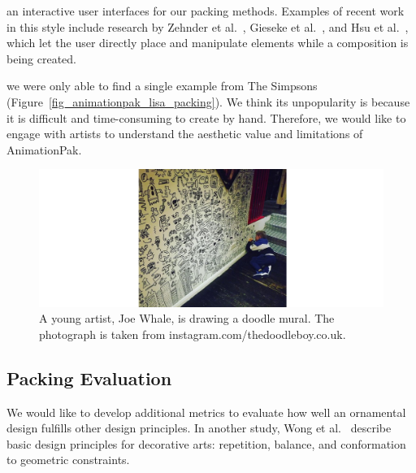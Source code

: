  an interactive user interfaces for our packing methods.
Examples of recent work in this style include research
by Zehnder et al.~\cite{Zehnder2016}, Gieseke et al.~\cite{Gieseke2017}, 
and Hsu et al.~\cite{Hsu2020}, which let the user directly place and manipulate
elements while a composition is being created.

we were only able to find a single example from The Simpsons (Figure~\ref{fig_animationpak_lisa_packing}). 
We think its unpopularity is because it is difficult and time-consuming to create by hand.
Therefore, we would like to engage with artists to understand the aesthetic value and limitations
of AnimationPak.

\begin{figure}
\centering
\includegraphics[width=1.0\textwidth]{figures/conclusions/doodle_boy.pdf}
\caption[A doodle mural by Joe Whale]
{ \label{doodle_boy} 
\nnewtext
{
A young artist, Joe Whale, is drawing a doodle mural. 
The photograph is taken from instagram.com/thedoodleboy.co.uk.
}
}
\end{figure}

\subsection{Packing Evaluation}

We would like to develop additional metrics to evaluate
how well an ornamental design fulfills other design principles.
In another study, Wong et al.~\cite{Wong1998} describe basic design
principles for decorative arts: repetition, balance, and conformation
to geometric constraints. 

